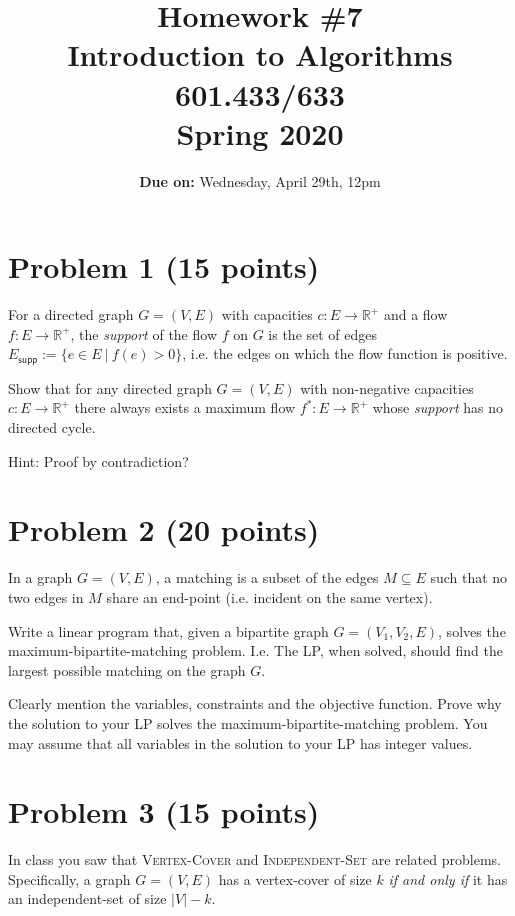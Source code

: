 \documentclass[letterpaper, 11pt]{article}
\newcommand{\R}{\mathbb{R}}
\newcommand{\supp}{\textsf{supp}}
\begin{document}
\title{Homework \#7 \\ Introduction to Algorithms \\ 601.433/633 \\Spring 2020}
\author{\textbf{Due on:} Wednesday, April 29th, 12pm}
\date{}
\maketitle


\setlength{\parindent}{0em}
\setlength{\parskip}{1em}

\section*{Problem 1 (15 points)}
For a directed graph $G =(V, E)$ with capacities $c : E \rightarrow \R^+$ and a flow $f : E \rightarrow \R^+$, the \emph{support} of the flow $f$ on $G$ is the set of edges $E_{\supp} := \{e \in E \ | \ f(e) > 0\}$, i.e. the edges on which the flow function is positive. 

Show that for any directed graph $G = (V, E)$ with non-negative capacities $c : E \rightarrow \R^+$ there always exists a maximum flow $f^* : E \rightarrow \R^+$ whose \textit{support} has no directed cycle.

Hint: Proof by contradiction?


\section*{Problem 2 (20 points)}

In a graph $G = (V, E)$, a matching is a subset of the edges $M \subseteq E$ such that no two edges in $M$ share an end-point (i.e. incident on the same vertex).

Write a linear program that, given a bipartite graph $G = (V_1, V_2, E)$, solves the maximum-bipartite-matching problem. I.e. The LP, when solved, should find the largest possible matching on the graph $G$. 

Clearly mention the variables, constraints and the objective function. Prove why the solution to your LP solves the maximum-bipartite-matching problem. You may assume that all variables in the solution to your LP has integer values. 


\section*{Problem 3 (15 points)}
In class you saw that \textsc{Vertex-Cover} and \textsc{Independent-Set} are related problems. Specifically, a graph $G = (V, E)$ has a vertex-cover of size $k$ \emph{if and only if} it has an independent-set of size $|V| - k$. 
\end{document}
